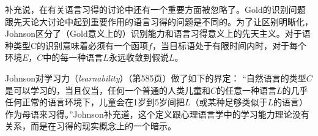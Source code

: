 \citet{Johnson2004a}补充说，在有关语言习得的讨论中还有一个重要方面被忽略了。Gold的识别问题跟先天论大讨论中起到重要作用的语言习得的问题是不同的。为了让区别明晰化，Johnson区分了（Gold意义上的）识别能力和语言习得意义上的先天主义。对于语种类型C的识别意味着必须有一个函项$f$，当目标语处于有限时间内时，对于每个环境$E$，$C$中的每一种语言$L$永远收敛到假说$L$。

Johnson对学习力（\emph{learnability}）（第585页）做了如下的界定：
“自然语言的类型$C$是可以学习的，当且仅当，任何一个普通的人类儿童和$C$的任意一种语言$L$的几乎任何正常的语言环境下，儿童会在1岁到5岁间把$L$（或某种足够类似于$L$的语言）作为母语来习得。”Johnson补充道，这个定义跟心理语言学中的学习能力理论没有关系，而是在习得的现实概念上的一个暗示。

